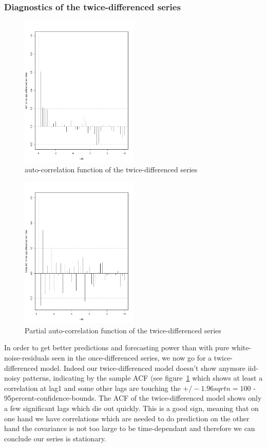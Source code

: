 \documentclass[11pt,a4paper]{article}
\begin{document}
\subsubsection{Diagnostics of the twice-differenced series}
\begin{figure}[!htb]
\centering
\includegraphics[angle=0,
width=0.5\textwidth]{diff2_acf}
\caption{auto-correlation function of the twice-differenced series
\label{fig:diff2_acf}}
\end{figure}
\begin{figure}[!htb]
\centering
\includegraphics[angle=0,
width=0.5\textwidth]{diff2_pacf}
\caption{Partial auto-correlation function of the twice-differenced series
\label{fig:diff2_pacf}}
\end{figure}
In order to get better predictions and forecasting power than with pure white-noise-residuals seen in the once-differenced series, we now go for a twice-differenced model. Indeed our twice-differenced model doesn't show anymore iid-noisy patterns, indicating by the sample ACF (see figure~\ref{fig:diff2_acf} which shows at least a correlation at lag1 and some other lags are touching the $+/-1.96sqrt{n=100}$ - 95percent-confidence-bounds. The ACF of the twice-differenced model shows only a few significant lags which die out quickly. This is a good sign, meaning that on one hand we have correlations which are needed to do prediction on the other hand the covariance is not too large to be time-dependant and therefore we can conclude our series is stationary.
\end{document}

